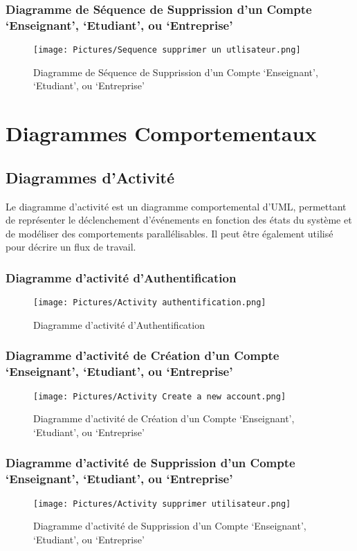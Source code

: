 \documentclass[11pt,fleqn]{book} %
\begin{document}
\subsubsection{Diagramme de Séquence de Supprission d’un 
Compte ‘Enseignant’, ‘Etudiant’, ou ‘Entreprise’}
\begin{figure}[h]
    \centering
    \texttt{[image: Pictures/Sequence supprimer un utlisateur.png]}
    \caption{Diagramme de Séquence de Supprission d’un 
Compte ‘Enseignant’, ‘Etudiant’, ou ‘Entreprise’}
    \label{fig:pca}
\end{figure}
\newpage
\section{Diagrammes Comportementaux}
\subsection{Diagrammes d’Activité}
Le diagramme d'activité est un diagramme comportemental d'UML, permettant de représenter le déclenchement d'événements en fonction des états du système et de modéliser des comportements parallélisables. Il peut être également utilisé pour décrire un flux de travail.
\newpage
\subsubsection{Diagramme d’activité d’Authentification}
\begin{figure}[h]
    \centering
    \texttt{[image: Pictures/Activity authentification.png]}
    \caption{Diagramme d’activité d’Authentification}
    \label{fig:pca}
\end{figure}
\newpage
\subsubsection{Diagramme d’activité de Création d’un 
Compte ‘Enseignant’, ‘Etudiant’, ou ‘Entreprise’}
\begin{figure}[h]
    \centering
    \texttt{[image: Pictures/Activity Create a new account.png]}
    \caption{Diagramme d’activité de Création d’un 
Compte ‘Enseignant’, ‘Etudiant’, ou ‘Entreprise’}
    \label{fig:pca}
\end{figure}
\newpage
\subsubsection{Diagramme d’activité de Supprission d’un 
Compte ‘Enseignant’, ‘Etudiant’, ou ‘Entreprise’}
\begin{figure}[h]
    \centering
    \texttt{[image: Pictures/Activity supprimer utilisateur.png]}
    \caption{Diagramme d’activité de Supprission d’un 
Compte ‘Enseignant’, ‘Etudiant’, ou ‘Entreprise’}
    \label{fig:pca}
\end{figure}
\newpage
\end{document}
